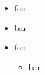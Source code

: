 
\def\mytitle{List Edge}


\begin{itemize}
\item foo
\item bar
\item foo

\begin{itemize}
\item bar
\end{itemize}
\end{itemize}



